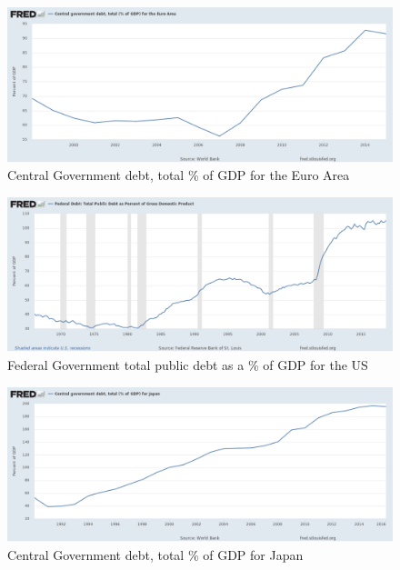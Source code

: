     \begin{figure}
        \centering
        \caption{Central Government debt, total \% of GDP for the Euro Area}
        \includegraphics[width=\textwidth]{img/ch-history/fredgraph_debt_EU.png}
       
        \label{fig:fedgraph_debt_EU}
    \end{figure}
    
    \begin{figure}
        \centering
        \caption{Federal Government total public debt as a \% of GDP for the US}
        \includegraphics[width=\textwidth]{img/ch-history/fredgraph_debt_US.png}
       
        \label{fig:fedgraph_debt_US}
    \end{figure}
    
    \begin{figure}
        \centering
        \caption{Central Government debt, total \% of GDP for Japan}
        \includegraphics[width=\textwidth]{img/ch-history/fredgraph_debt_JPN.png}
       
        \label{fig:fedgraph_debt_JPN}
    \end{figure}

